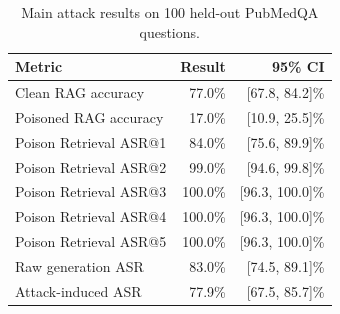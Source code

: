 \begin{table}[t]
\centering
\caption{Main attack results on 100 held-out PubMedQA questions.}
\label{tab:main-results}
\begin{tabular}{lrr}
\hline
Metric & Result & 95\% CI \\
\hline
Clean RAG accuracy & 77.0\% & [67.8, 84.2]\% \\
Poisoned RAG accuracy & 17.0\% & [10.9, 25.5]\% \\
Poison Retrieval ASR@1 & 84.0\% & [75.6, 89.9]\% \\
Poison Retrieval ASR@2 & 99.0\% & [94.6, 99.8]\% \\
Poison Retrieval ASR@3 & 100.0\% & [96.3, 100.0]\% \\
Poison Retrieval ASR@4 & 100.0\% & [96.3, 100.0]\% \\
Poison Retrieval ASR@5 & 100.0\% & [96.3, 100.0]\% \\
Raw generation ASR & 83.0\% & [74.5, 89.1]\% \\
Attack-induced ASR & 77.9\% & [67.5, 85.7]\% \\
\hline
\end{tabular}
\end{table}
